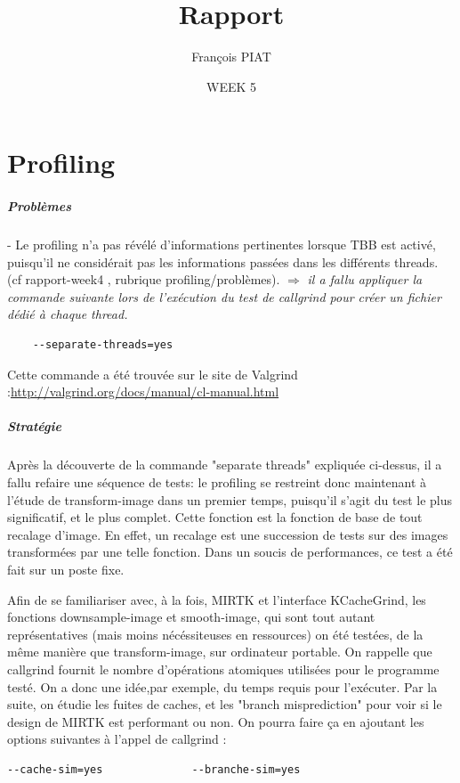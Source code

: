 \documentclass{report}
\title{Rapport}
\author{François PIAT}
\date{WEEK 5 }
\begin{document}
\maketitle

\chapter*{Profiling}

\paragraph{Problèmes}

- Le profiling n'a pas révélé d'informations pertinentes lorsque TBB est activé, puisqu'il ne considérait pas les informations passées dans les différents threads. (cf rapport-week4 , rubrique profiling/problèmes). \newline
	$\Longrightarrow$ \textit{il a fallu appliquer la commande suivante lors de l'exécution du test de callgrind pour créer un fichier dédié à chaque thread.}
	\begin{lstlisting} 
	--separate-threads=yes 
	\end{lstlisting} 
	Cette commande a été trouvée sur le site de Valgrind :\url{http://valgrind.org/docs/manual/cl-manual.html}
	
\paragraph{Stratégie} 
Après la découverte de la commande "separate threads" expliquée ci-dessus, il a fallu refaire une séquence de tests: le profiling se restreint donc maintenant à l'étude de transform-image dans un premier temps, puisqu'il s'agit du test le plus significatif, et le plus complet. Cette fonction est la fonction de base de tout recalage d'image. En effet, un recalage est une succession de tests sur des images transformées par une telle fonction. Dans un soucis de performances, ce test a été fait sur un poste fixe.

Afin de se familiariser avec, à la fois, MIRTK et l'interface KCacheGrind, les fonctions downsample-image et smooth-image, qui sont tout autant représentatives (mais moins nécéssiteuses en ressources) on été testées, de la même manière que transform-image, sur ordinateur portable.\newline
On rappelle que callgrind fournit le nombre d'opérations atomiques utilisées pour le programme testé. On a donc une idée,par exemple, du temps requis pour l'exécuter.
\newline
Par la suite, on étudie les fuites de caches, et les "branch misprediction" pour voir si le design de MIRTK est performant ou non. On pourra faire ça en ajoutant les options suivantes à l'appel de callgrind : 
\begin{lstlisting} 
--cache-sim=yes              --branche-sim=yes
\end{lstlisting} 
\end{document}
